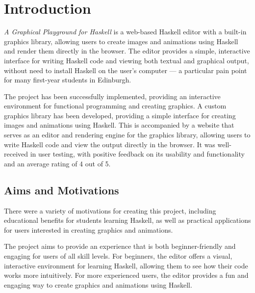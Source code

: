 \documentclass[../main.tex]{subfiles}
\begin{document}
\chapter{Introduction} \label{ch:introduction}
    \emph{A Graphical Playground for Haskell} is a web-based Haskell
    editor with a built-in graphics library, allowing users to create images and
    animations using Haskell and render them directly in the browser.
    The editor provides a simple, interactive interface for writing Haskell code
        and viewing both textual and graphical output, without need to install Haskell
        on the user's computer — a particular pain point for many first-year students
        in Edinburgh.

    The project has been successfully implemented, providing an interactive
        environment for functional programming and creating graphics.
    A custom graphics library has been developed, providing a simple interface for
        creating images and animations using Haskell.
    This is accompanied by a website that serves as an editor and rendering engine
        for the graphics library, allowing users to write Haskell code and view the
        output directly in the browser.
    It was well-received in user testing, with positive feedback on its usability
        and functionality and an average rating of 4 out of 5.

    \section{Aims and Motivations}
        There were a variety of motivations for creating this project, including
            educational benefits for students learning Haskell, as well as practical
            applications for users interested in creating graphics and animations.

        The project aims to provide an experience that is both beginner-friendly and
            engaging for users of all skill levels.
        For beginners, the editor offers a visual, interactive environment for learning
            Haskell, allowing them to see how their code works more intuitively.
        For more experienced users, the editor provides a fun and engaging way to
            create graphics and animations using Haskell.
\end{document}
